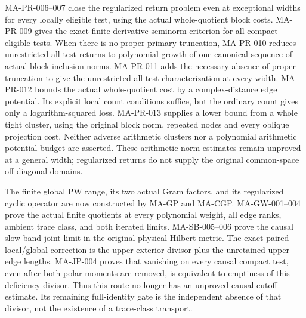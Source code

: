\documentclass[11pt,a4paper]{article}
\begin{document}
MA-PR-006--007 close the regularized return problem even at
exceptional widths for every locally eligible test, using the
actual whole-quotient block costs. MA-PR-009 gives the exact
finite-derivative-seminorm criterion for all compact eligible
tests. When there is no proper primary truncation, MA-PR-010
reduces unrestricted all-test returns to polynomial growth of
one canonical sequence of actual block inclusion norms.
MA-PR-011 adds the necessary absence of proper truncation to give
the unrestricted all-test characterization at every width.
MA-PR-012 bounds the actual whole-quotient cost by a complex-distance
edge potential. Its explicit local count conditions suffice, but
the ordinary count gives only a logarithm-squared loss.
MA-PR-013 supplies a lower bound from a whole tight cluster,
using the original block norm, repeated nodes and every oblique
projection cost. Neither adverse arithmetic clusters nor a
polynomial arithmetic potential budget are asserted.
These arithmetic norm estimates remain unproved at a general
width; regularized returns do not supply the original
common-space off-diagonal domains.

The finite global PW range, its two actual Gram factors, and its
regularized cyclic operator are now constructed by MA-GP and
MA-CGP. MA-GW-001--004 prove the actual finite quotients at every
polynomial weight, all edge ranks, ambient trace class, and both
iterated limits. MA-SB-005--006 prove the causal slow-band joint
limit in the original physical Hilbert metric. The exact paired
local/global correction is the upper exterior divisor plus the
unretained upper-edge lengths. MA-JP-004 proves that vanishing
on every causal compact test, even after both polar moments are
removed, is equivalent to emptiness of this deficiency divisor.
Thus this route no longer has an unproved causal cutoff estimate.
Its remaining full-identity gate is the independent absence of
that divisor, not the existence of a trace-class transport.
\end{document}
